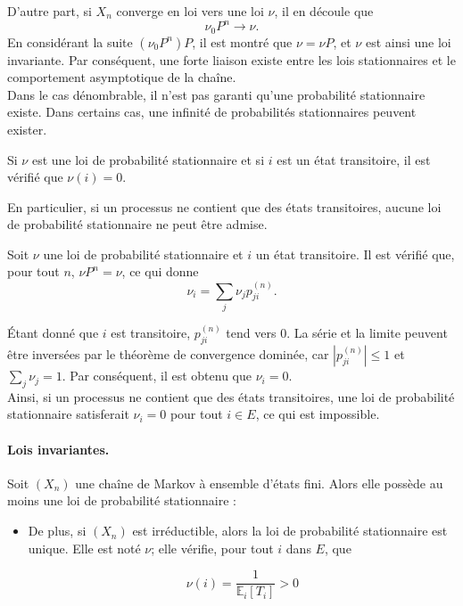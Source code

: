\begin{sloppypar}
D'autre part, si $X_n$ converge en loi vers une loi $\nu$, il en découle que 
\[
\nu_0 P^n \to \nu.
\]
En considérant la suite $(\nu_0 P^n)P$, il est montré que $\nu = \nu P$, et $\nu$ est ainsi une loi invariante. Par conséquent, une forte liaison existe entre les lois stationnaires et le comportement asymptotique de la chaîne.\\

Dans le cas dénombrable, il n’est pas garanti qu'une probabilité stationnaire existe. Dans certains cas, une infinité de probabilités stationnaires peuvent exister.

\begin{tcolorbox}[colback=green!5!white,colframe=green!75!black,title=Proposition]
Si $\nu$ est une loi de probabilité stationnaire et si $i$ est un état transitoire, il est vérifié que $\nu(i) = 0$. 

En particulier, si un processus ne contient que des états transitoires, aucune loi de probabilité stationnaire ne peut être admise.
\end{tcolorbox}    

Soit $\nu$ une loi de probabilité stationnaire et $i$ un état transitoire. Il est vérifié que, pour tout $n$, $\nu P^n = \nu$, ce qui donne 
\[
\nu_i = \sum_j \nu_j p^{(n)}_{ji}.
\]

Étant donné que $i$ est transitoire, $p^{(n)}_{ji}$ tend vers $0$. La série et la limite peuvent être inversées par le théorème de convergence dominée, car $|p^{(n)}_{ji}| \leq 1$ et $\sum_j \nu_j = 1$. Par conséquent, il est obtenu que $\nu_i = 0$.\\

Ainsi, si un processus ne contient que des états transitoires, une loi de probabilité stationnaire satisferait $\nu_i = 0$ pour tout $i \in E$, ce qui est impossible.

\paragraph{Lois invariantes.}

Soit $(X_n)$ une chaîne de Markov à ensemble d’états fini. Alors elle possède au moins une loi de probabilité stationnaire :

\begin{itemize}
\item De plus, si $(X_n)$ est irréductible, alors la loi de probabilité stationnaire est unique. Elle est 
noté  $\nu$; elle vérifie, pour tout $i$ dans $E$, que
    
\begin{equation}
    \nu(i) = \frac{1}{\mathbb{E}_i [T_i]} > 0 
\end{equation}
    

\end{itemize}
\end{sloppypar}
